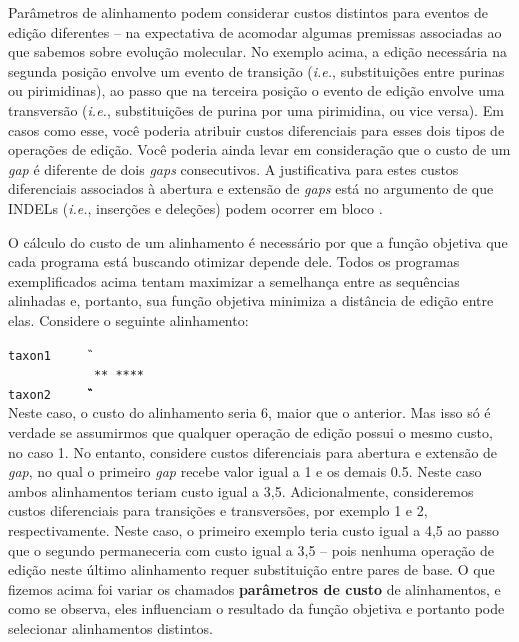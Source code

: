\begin{refsection}
Parâmetros de alinhamento podem considerar custos distintos para eventos de edição diferentes -- na expectativa de acomodar algumas premissas associadas ao que sabemos sobre evolução molecular. No exemplo acima, a edição necessária na segunda posição envolve um evento de transição (\textit{i.e.}, substituições entre purinas ou pirimidinas), ao passo que na terceira posição o evento de edição envolve uma transversão (\textit{i.e.}, substituições de purina por uma pirimidina, ou vice versa). Em casos como esse, você poderia atribuir custos diferenciais para esses dois tipos de operações de edição. Você poderia ainda levar em consideração que o custo de um \textit{gap} é diferente de dois \textit{gaps} consecutivos. A justificativa para estes custos diferenciais associados à abertura e extensão de \textit{gaps} está no argumento de que INDELs (\textit{i.e.}, inserções e deleções) podem ocorrer em bloco \parencite[mas veja ][]{Giribet_and_Wheeler_1999, Phillips_et_al_2000}.

O cálculo do custo de um alinhamento é necessário por que a função objetiva que cada programa está buscando otimizar depende dele. Todos os programas exemplificados acima tentam maximizar a semelhança entre as sequências alinhadas e, portanto, sua função objetiva minimiza a distância de edição entre elas. Considere o seguinte alinhamento:

\indent\indent\indent\indent\indent\indent\indent\texttt{taxon1~~~~~\T\A\T\G\gap\gap\gap\gap\A}\\
\indent\indent\indent\indent\indent\indent\indent\texttt{~~~~~~~~~~~~**~****~}\\
\indent\indent\indent\indent\indent\indent\indent\texttt{taxon2~~~~~\T\gap\gap\G\G\G\C\C\A}\\

Neste caso, o custo do alinhamento seria 6, maior que o anterior. Mas isso só é verdade se assumirmos que qualquer operação de edição possui o mesmo custo, no caso 1. No entanto, considere custos diferenciais para abertura e extensão de \textit{gap}, no qual o primeiro \textit{gap} recebe valor igual a 1 e os demais 0.5. Neste caso ambos alinhamentos teriam custo igual a 3,5. Adicionalmente, consideremos custos diferenciais para transições e transversões, por exemplo 1 e 2, respectivamente. Neste caso, o primeiro exemplo teria custo igual a 4,5 ao passo que o segundo permaneceria com custo igual a 3,5 -- pois nenhuma operação de edição neste último alinhamento requer substituição entre pares de base. O que fizemos acima foi variar os chamados \textbf{parâmetros de custo} de alinhamentos, e como se observa, eles influenciam o resultado da função objetiva e portanto pode selecionar alinhamentos distintos.


\end{refsection}
